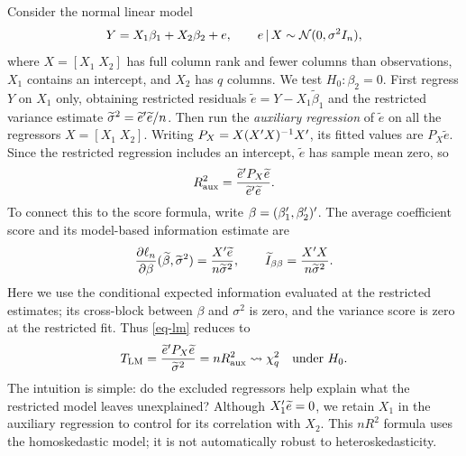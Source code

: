 \documentclass[a4paper,12pt]{article}
\begin{document}
Consider the normal linear model
\begin{align*}
	Y=X_1\beta_1+X_2\beta_2+e,
	\qquad e\mathpunct{}|\mathpunct{} X\sim\operatorname{\mathcal{N}}(0,\sigma^2 I_n),
\end{align*}
where $X=[X_1\;X_2]$ has full column rank and fewer columns than observations,
$X_1$ contains an intercept, and $X_2$ has $q$ columns.
We test $H_0:\beta_2=0$.
First regress $Y$ on $X_1$ only, obtaining restricted residuals
$\widetilde e=Y-X_1\widetilde\beta_1$ and the restricted variance estimate
$\widetilde\sigma^2=\widetilde e^{\prime}\widetilde e/n$.
Then run the \emph{auxiliary regression} of $\widetilde e$ on all the regressors $X=[X_1\;X_2]$.
Writing $P_X=X(X^{\prime} X)^{-1} X^{\prime}$, its fitted values are $P_X\widetilde e$.
Since the restricted regression includes an intercept, $\widetilde e$ has sample mean zero, so
\begin{align*}
	R_{\mathrm{aux}}^2
	=\frac{\widetilde e^{\prime} P_X\widetilde e}{\widetilde e^{\prime}\widetilde e}.
\end{align*}
To connect this to the score formula, write $\beta=(\beta_1^{\prime},\beta_2^{\prime})^{\prime}$.
The average coefficient score and its model-based information estimate are
\begin{align*}
	\frac{\partial\ell_n}{\partial\beta}(\widetilde\beta,\widetilde\sigma^2)
	=\frac{X^{\prime}\widetilde e}{n\widetilde\sigma^2},
	\qquad
	\widetilde I_{\beta\beta}=\frac{X^{\prime} X}{n\widetilde\sigma^2}.
\end{align*}
Here we use the conditional expected information evaluated at the restricted estimates;
its cross-block between $\beta$ and $\sigma^2$ is zero, and the variance score is zero at the restricted fit.
Thus \eqref{eq-lm} reduces to
\begin{align}
	T_{\mathrm{LM}}
	=\frac{\widetilde e^{\prime} P_X\widetilde e}{\widetilde\sigma^2}
	=nR_{\mathrm{aux}}^2
	\overset{}{\leadsto}\chi_q^2\quad\text{under }H_0.
\end{align}
The intuition is simple: do the excluded regressors help explain what the restricted model leaves unexplained?
Although $X_1^{\prime}\widetilde e=0$, we retain $X_1$ in the auxiliary regression to control for its correlation with $X_2$.
This $nR^2$ formula uses the homoskedastic model; it is not automatically robust to heteroskedasticity.
\end{document}
